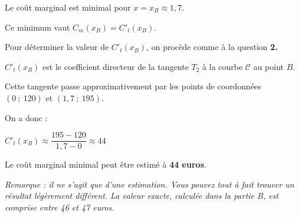 \begin{corrige}
\begin{enumerate}
\begin{center}
\begin{extern}
               \end{extern}
          \end{center}
          Le coût marginal est minimal pour $x=x_B \approx 1,7$.
          \par
          Ce minimum vaut $C_m(x_B)=C'_t(x_B)$.
          \par
          Pour déterminer la valeur de $C'_t(x_B)$, on procède comme à la question \textbf{2.}
          \par
          $C'_t(x_B)$ est le coefficient directeur de la tangente $T_2$ à la courbe $\mathscr{C}$ au point $B$.
          \par
          Cette tangente passe approximativement par les points de coordonnées $(0~;~120)$ et $(1,7~;~195)$.
          \par
          On a donc :
          \par
          $C'_t(x_B) \approx \dfrac{195-120}{1,7-0} \approx 44$
          \par
          Le coût marginal minimal peut être estimé à \textbf{44 euros}.
          \par
          \textit{Remarque : il ne s'agit que d'une estimation. Vous pouvez tout à fait trouver un résultat légèrement différent. La valeur exacte, calculée dans la partie B, est comprise entre 46 et 47 euros.}
          \par
     \end{enumerate}
     \par
     \par

\end{corrige}
